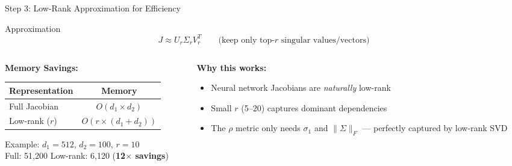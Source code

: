 \documentclass[aspectratio=169, 11pt]{beamer}
\begin{document}
\begin{frame}{Step 3: Low-Rank Approximation for Efficiency}
  \begin{block}{Approximation}
    \[
    J \approx U_r \Sigma_r V_r^T
    \qquad \text{(keep only top-$r$ singular values/vectors)}
    \]
  \end{block}

  \vspace{0.2cm}
  \begin{columns}[T]
    \begin{column}{0.50\textwidth}
      \textbf{Memory Savings:}
      \begin{center}
        \renewcommand{\arraystretch}{1.3}
        \begin{tabular}{>{\footnotesize}l >{\footnotesize}c}
          \toprule
          \textbf{Representation} & \textbf{Memory} \\
          \midrule
          Full Jacobian & $O(d_1 \times d_2)$ \\
          \rowcolor{hlrow}
          Low-rank ($r$) & $O(r \times (d_1 + d_2))$ \\
          \bottomrule
        \end{tabular}
      \end{center}
      \vspace{0.2cm}
      {\footnotesize Example: $d_1 = 512$, $d_2 = 100$, $r = 10$\\
      Full: 51,200 \quad Low-rank: 6,120 \quad (\textbf{12$\times$ savings})}
    \end{column}
    \begin{column}{0.45\textwidth}
      \textbf{Why this works:}
      \begin{itemize}
        \item Neural network Jacobians are \emph{naturally} low-rank
        \item Small $r$ (5--20) captures dominant dependencies
        \item The $\rho$ metric only needs $\sigma_1$ and $\|\Sigma\|_F$ — perfectly captured by low-rank SVD
      \end{itemize}
    \end{column}
  \end{columns}
\end{frame}
\end{document}
